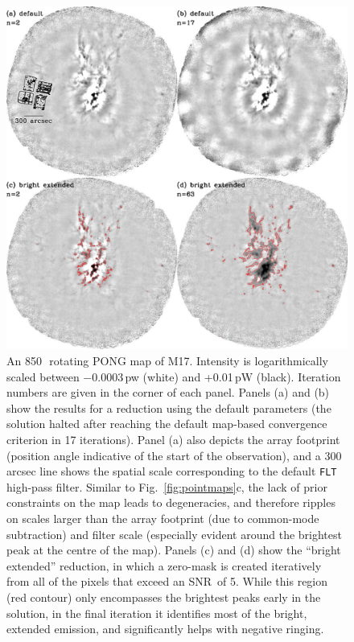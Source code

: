 \documentclass[useAMS,usenatbib,nofootinbib]{mn2e}
\newcommand{\snr}{SNR}
\newcommand{\model}[1]{\texttt{#1}}
\begin{document}
\begin{figure}
\centering
\includegraphics[width=\linewidth]{m17.pdf}
\caption{An 850\,\micron\ rotating PONG map of M17. Intensity is
logarithmically scaled between $-$0.0003\,pw (white) and +0.01\,pW
(black). Iteration numbers are given in the corner of each
panel. Panels (a) and (b) show the results for a reduction using the
default parameters (the solution halted after reaching the default
map-based convergence criterion in 17 iterations). Panel (a) also
depicts the array footprint (position angle indicative of the start of
the observation), and a 300\,arcsec line shows the spatial scale
corresponding to the default \model{FLT} high-pass filter. Similar to
Fig.~\ref{fig:pointmaps}c, the lack of prior constraints on the map
leads to degeneracies, and therefore ripples on scales larger than the
array footprint (due to common-mode subtraction) and filter scale
(especially evident around the brightest peak at the centre of the
map). Panels (c) and (d) show the ``bright extended'' reduction, in
which a zero-mask is created iteratively from all of the pixels that
exceed an \snr\ of 5. While this region (red contour) only encompasses
the brightest peaks early in the solution, in the final iteration it
identifies most of the bright, extended emission, and significantly
helps with negative ringing.}
\label{fig:m17}
\end{figure}
\end{document}
